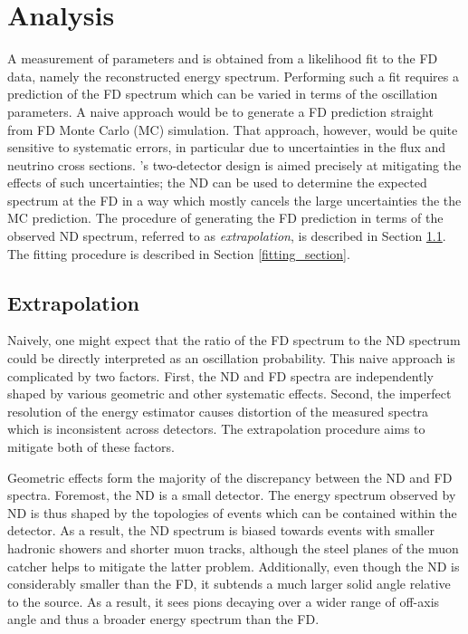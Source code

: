 \chapter{Analysis}
\label{analysis_chapter}

A measurement of parameters \deltamtht and \thetatth is obtained from
a likelihood fit to the FD data, namely the reconstructed energy spectrum.
Performing such a fit requires a prediction of the FD spectrum which can be
varied in terms of the oscillation parameters.
A naive approach would be to generate a FD prediction straight from
FD Monte Carlo (MC) simulation.
That approach, however, would be quite sensitive to systematic errors,
in particular due to uncertainties  in the \numi flux and neutrino
cross sections.
\nova's two-detector design is aimed precisely at mitigating the effects of
such uncertainties; the ND can be used to determine the expected
spectrum at the FD in a way which mostly cancels the large uncertainties the
the MC prediction.
The procedure of generating the FD prediction in terms of the observed
ND spectrum, referred to as \textit{extrapolation}, is described in Section
\ref{extrap_section}.
The fitting procedure is described in Section \ref{fitting_section}.


\section{Extrapolation}
\label{extrap_section}


Naively, one might expect that the ratio of the FD spectrum to the ND spectrum
could be directly interpreted as an oscillation probability.
This naive approach is complicated by two factors.
First, the ND and FD spectra are independently shaped by various geometric
and other systematic effects.
Second, the imperfect resolution of the energy estimator causes
distortion of the measured spectra which is inconsistent across detectors.
The extrapolation procedure aims to mitigate both of these factors.

Geometric effects form the majority of the discrepancy between the
ND and FD spectra.
Foremost, the ND is a small detector.
The energy spectrum observed by ND is thus shaped by the topologies
of events which can be contained within the detector.
As a result, the ND spectrum is biased towards events with
smaller hadronic showers and shorter muon tracks, although the steel planes
of the muon catcher helps to mitigate the latter problem.
Additionally, even though the ND is considerably smaller than the FD,
it subtends a much larger solid angle relative to the \numi source.
As a result, it sees pions decaying over a wider range of off-axis angle
and thus a broader energy spectrum than the FD.

